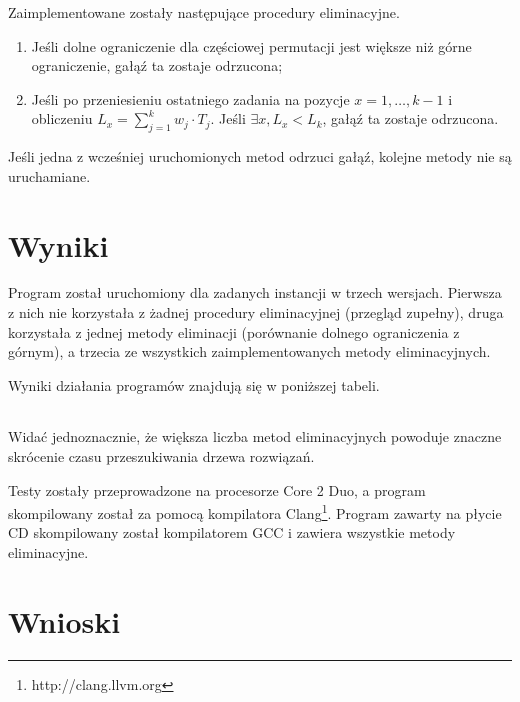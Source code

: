   Zaimplementowane zostały następujące procedury eliminacyjne.
  \begin{enumerate}
    \item Jeśli dolne ograniczenie dla częściowej permutacji jest większe niż
          górne ograniczenie, gałąź ta zostaje odrzucona;
    \item Jeśli po przeniesieniu ostatniego zadania na pozycje $x = 1,\ldots,k-1$
          i obliczeniu $L_x = \sum_{j=1}^{k} w_j \cdot T_j$. Jeśli $\exists x, L_x < L_k$,
          gałąź ta zostaje odrzucona.
  \end{enumerate}

  Jeśli jedna z wcześniej uruchomionych metod odrzuci gałąź, kolejne metody nie
  są uruchamiane.


\section{Wyniki} %
  \label{sec:wyniki}

  Program został uruchomiony dla zadanych instancji w trzech wersjach.
  Pierwsza z nich nie korzystała z żadnej procedury eliminacyjnej (przegląd
  zupełny), druga korzystała z jednej metody eliminacji (porównanie dolnego
  ograniczenia z górnym), a trzecia ze wszystkich zaimplementowanych metody
  eliminacyjnych.

  Wyniki działania programów znajdują się w poniższej tabeli.

  \begin{center}
    \begin{tabular}{c}

    \end{tabular}
  \end{center}

  Widać jednoznacznie, że większa liczba metod eliminacyjnych powoduje znaczne
  skrócenie czasu przeszukiwania drzewa rozwiązań.

  Testy zostały przeprowadzone na procesorze Core 2 Duo, a program skompilowany
  został za pomocą kompilatora Clang\footnote{http://clang.llvm.org}. Program
  zawarty na płycie CD skompilowany został kompilatorem GCC i zawiera wszystkie
  metody eliminacyjne.


\section{Wnioski} %
  \label{sec:wnioski}

